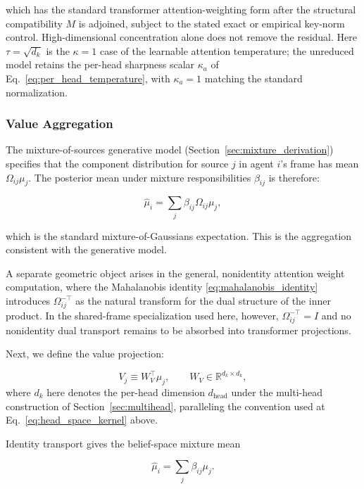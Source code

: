 \documentclass[twoside,11pt]{article}
\begin{document}
which has the standard transformer attention-weighting form after the structural compatibility $M$ is adjoined, subject to the stated exact or empirical key-norm control. High-dimensional concentration alone does not remove the residual. Here $\tau = \sqrt{d_k}$ is the $\kappa = 1$ case of the learnable attention temperature; the unreduced model retains the per-head sharpness scalar $\kappa_a$ of Eq.~\eqref{eq:per_head_temperature}, with $\kappa_a = 1$ matching the standard normalization.

\subsubsection{Value Aggregation}\label{sec:value_aggregation}

The mixture-of-sources generative model (Section~\ref{sec:mixture_derivation}) specifies that the component distribution for source $j$ in agent $i$'s frame has mean $\Omega_{ij}\mu_j$. The posterior mean under mixture responsibilities $\beta_{ij}$ is therefore:

\begin{equation}
\hat\mu_i = \sum_j \beta_{ij} \Omega_{ij}\mu_j,
\label{eq:glk_mixture_aggregation}
\end{equation}

which is the standard mixture-of-Gaussians expectation. This is the aggregation consistent with the generative model.

A separate geometric object arises in the general, nonidentity attention weight computation, where the Mahalanobis identity \eqref{eq:mahalanobis_identity} introduces $\Omega_{ij}^{-\top}$ as the natural transform for the dual structure of the inner product. In the shared-frame specialization used here, however, $\Omega_{ij}^{-\top} = I$ and no nonidentity dual transport remains to be absorbed into transformer projections.


Next, we define the value projection:

\begin{equation}
V_j \equiv W_V^{\top}\mu_j, \qquad W_V \in \mathbb{R}^{d_k \times d_k},
\end{equation}
where $d_k$ here denotes the per-head dimension $d_{\text{head}}$ under the multi-head construction of Section~\ref{sec:multihead}, paralleling the convention used at Eq.~\eqref{eq:head_space_kernel} above.

Identity transport gives the belief-space mixture mean

\begin{equation}
\hat\mu_i = \sum_j\beta_{ij}\mu_j.
\end{equation}
\end{document}
